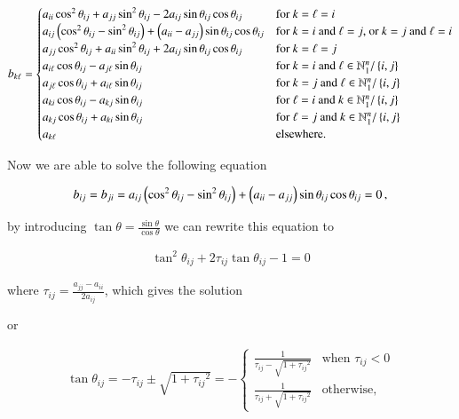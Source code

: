 \documentclass[11pt,english,a4paper]{article}
\begin{document}
\begin{flushleft}
\begin{align}
b_{k\ell} = \begin{cases} a_{ii} \cos^2\theta_{ij}  + a_{jj}\sin^2 \theta_{ij} - 2 a_{ij}\sin\theta_{ij}\cos\theta_{ij} & \text{for $k=\ell=i$} \\ a_{ij}\left({\cos^2\theta_{ij} - \sin^2\theta_{ij}}\right) + \left({a_{ii}-a_{jj}}\right)\sin\theta_{ij}\cos\theta_{ij} & \text{for $k=i$ and $\ell = j$, or $k=j$ and $\ell = i$} \\ a_{jj} \cos^2\theta_{ij}  + a_{ii}\sin^2 \theta_{ij} + 2 a_{ij}\sin\theta_{ij}\cos\theta_{ij} & \text{for $k=\ell=j$} \\ a_{i \ell} \cos\theta_{ij} -  a_{j\ell} \sin\theta_{ij} & \text{for $k=i$ and $\ell\in\mathbb{N}_1^n / \left\lbrace{i,j}\right\rbrace$} \\ a_{j\ell} \cos\theta_{ij} + a_{i\ell}\sin\theta_{ij} & \text{for $k=j$ and $\ell\in\mathbb{N}_1^n / \left\lbrace{i,j}\right\rbrace$} \\ a_{ki} \cos\theta_{ij} - a_{kj}\sin\theta_{ij} & \text{for $\ell=i$ and $k\in\mathbb{N}_1^n / \left\lbrace{i,j}\right\rbrace$} \\ a_{kj}\cos\theta_{ij} + a_{ki}\sin\theta_{ij} & \text{for $\ell=j$ and $k\in\mathbb{N}_1^n / \left\lbrace{i,j}\right\rbrace$} \\ a_{k\ell} & \text{elsewhere.}\end{cases}
\label{eq_14}
\end{align}

Now we are able to solve the following equation

\begin{align*}
b_{ij}=b_{ji} = a_{ij}\left({\cos^2\theta_{ij} - \sin^2\theta_{ij}}\right)+\left({a_{ii}-a_{jj}}\right)\sin\theta_{ij}\cos\theta_{ij} = 0 \,,
\end{align*}

by introducing $\tan\theta = \frac{\sin\theta}{\cos\theta}$ we can rewrite this equation to

\begin{align*}
\tan^2\theta_{ij} + 2\tau_{ij}\tan\theta_{ij} -1 = 0
\end{align*}

where $\tau_{ij} = \frac{a_{jj}-a_{ii}}{2a_{ij}}$, which gives the solution

or

\begin{align}
\tan\theta_{ij} = -\tau_{ij} \pm \sqrt{1+{\tau_{ij}}^2} = -\begin{cases} \frac{1}{\tau_{ij}-\sqrt{1+{\tau_{ij}}^2}} & \text{when } \tau_{ij}< 0 \\ \frac{1}{\tau_{ij}+\sqrt{1+{\tau_{ij}}^2}} & \text{otherwise,} \end{cases}
\label{eq_15}
\end{align}


\end{flushleft}
\end{document}
